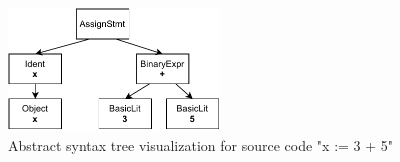 \begin{figure}[htp!]
    \centering
    \includegraphics[width=0.5\textwidth]{assets/figures/chapter2/ast.pdf}
    \caption{Abstract syntax tree visualization for source code "x := 3 + 5"}
    \label{fig:ast}
\end{figure}

